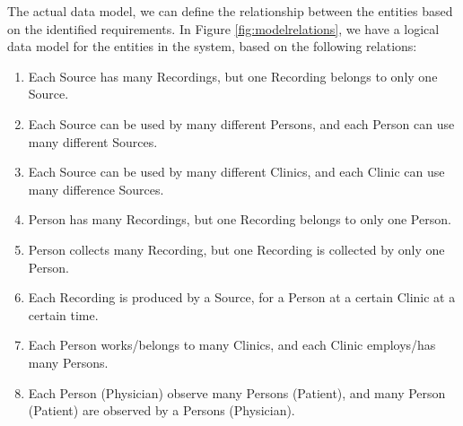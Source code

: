 The actual data model, we can define the relationship between the entities based on the identified requirements. In Figure \ref{fig:modelrelations}, we have a logical data model for the entities in the system, based on the following relations:
\begin{enumerate}[label=\alph*)]
    \item Each Source has many Recordings, but one Recording belongs to only one Source.
    \item Each Source can be used by many different Persons, and each Person can use many different Sources.
    \item Each Source can be used by many different Clinics, and each Clinic can use many difference Sources.
    \item Person has many Recordings, but one Recording belongs to only one Person.
    \item Person collects many Recording, but one Recording is collected by only one Person.
    \item Each Recording is produced by a Source, for a Person at a certain Clinic at a certain time.
    \item Each Person works/belongs to many Clinics, and each Clinic employs/has many Persons.
    \item Each Person (Physician) observe many Persons (Patient), and many Person (Patient) are observed by a Persons (Physician).
\end{enumerate}

